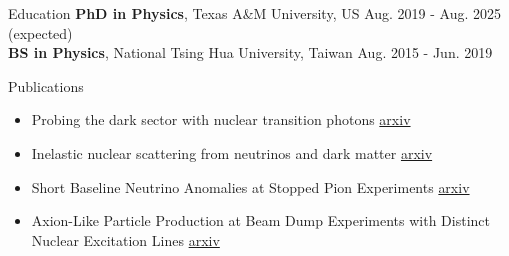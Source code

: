 \documentclass{resume}
\begin{document}
\vspace{-1.5em}
\begin{rSection}{Education}
\vspace{-0.25em}
{\bf PhD in Physics}, Texas A\&M University, US \hfill {Aug. 2019 - Aug. 2025 (expected)} \\
{\bf BS in Physics}, National Tsing Hua University, Taiwan \hfill {Aug. 2015 - Jun. 2019}
\end{rSection}


\vspace{-0.5em}
\begin{rSection}{Publications}
    \begin{itemize}
        \item Probing the dark sector with nuclear transition photons \hfill \href{https://arxiv.org/pdf/2302.10250.pdf}{arxiv}
        \item Inelastic nuclear scattering from neutrinos and dark matter \hfill \href{https://arxiv.org/pdf/2206.08590.pdf}{arxiv}
        \item Short Baseline Neutrino Anomalies at Stopped Pion Experiments \hfill \href{https://arxiv.org/abs/2310.13194}{arxiv}
        \item Axion-Like Particle Production at Beam Dump Experiments with Distinct Nuclear Excitation Lines \hfill \href{https://arxiv.org/pdf/2207.13659.pdf}{arxiv}
    \end{itemize}
\end{rSection}
\end{document}
